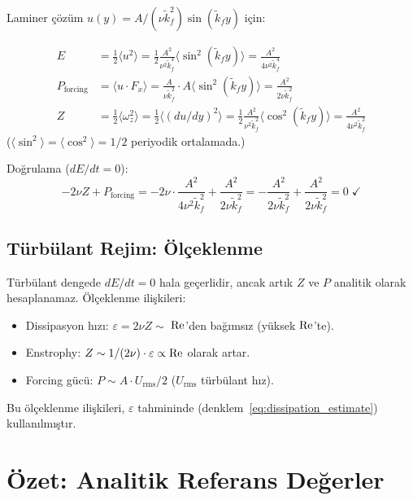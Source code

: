 Laminer çözüm $u(y) = A/(\nu \tilde{k}_f^2) \sin(\tilde{k}_f y)$ için:

\begin{align}
    E &= \frac{1}{2} \langle u^2 \rangle = \frac{1}{2} \frac{A^2}{\nu^2 \tilde{k}_f^4} \langle \sin^2(\tilde{k}_f y) \rangle = \frac{A^2}{4 \nu^2 \tilde{k}_f^4} \\[8pt]
    P_{\text{forcing}} &= \langle u \cdot F_x \rangle = \frac{A}{\nu \tilde{k}_f^2} \cdot A \langle \sin^2(\tilde{k}_f y) \rangle = \frac{A^2}{2\nu \tilde{k}_f^2} \\[8pt]
    Z &= \frac{1}{2} \langle \omega_z^2 \rangle = \frac{1}{2} \langle (du/dy)^2 \rangle = \frac{1}{2} \frac{A^2}{\nu^2 \tilde{k}_f^2} \langle \cos^2(\tilde{k}_f y) \rangle = \frac{A^2}{4\nu^2 \tilde{k}_f^2}
\end{align}
($\langle \sin^2 \rangle = \langle \cos^2 \rangle = 1/2$ periyodik ortalamada.)

Doğrulama ($dE/dt = 0$):
\begin{equation}
    -2\nu Z + P_{\text{forcing}} = -2\nu \cdot \frac{A^2}{4\nu^2 \tilde{k}_f^2} + \frac{A^2}{2\nu \tilde{k}_f^2} = -\frac{A^2}{2\nu \tilde{k}_f^2} + \frac{A^2}{2\nu \tilde{k}_f^2} = 0 \; \checkmark
\end{equation}

\subsection{Türbülant Rejim: Ölçeklenme}

Türbülant dengede $dE/dt = 0$ hala geçerlidir, ancak artık $Z$ ve $P$ analitik olarak hesaplanamaz. Ölçeklenme ilişkileri:
\begin{itemize}
    \item Dissipasyon hızı: $\varepsilon = 2\nu Z \sim$ $\mathrm{Re}$'den bağımsız (yüksek $\mathrm{Re}$'te).
    \item Enstrophy: $Z \sim 1/(2\nu) \cdot \varepsilon \propto \mathrm{Re}$ olarak artar.
    \item Forcing gücü: $P \sim A \cdot U_{\text{rms}} / 2$ ($U_{\text{rms}}$ türbülant hız).
\end{itemize}

Bu ölçeklenme ilişkileri, $\varepsilon$ tahmininde (denklem~\ref{eq:dissipation_estimate}) kullanılmıştır.


\section{Özet: Analitik Referans Değerler}
\label{sec:analitik_ozet}

